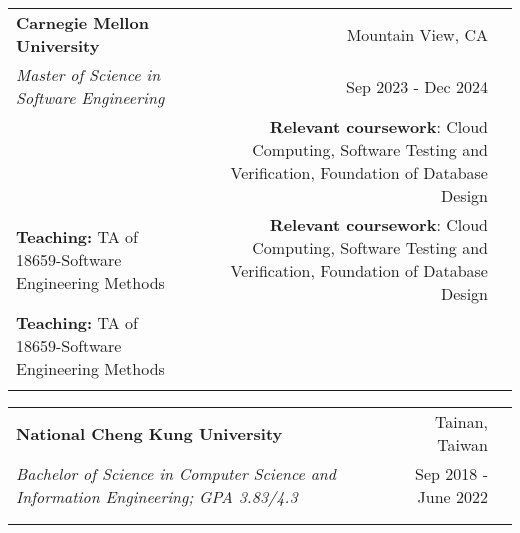 \newcommand{\resumeEduEntry}[5]{
  \vspace{5pt}\item
    \begin{tabular*}{0.97\textwidth}{l@{\extracolsep{\fill}}r}
      \textbf{#1} & \small #2 \\
      \textit{#3} & \small #4 \\
      \ifx&#5&%
      \else \small #5 \\ \fi
    \end{tabular*}\vspace{-5pt}
}

\resumeEduEntry 
{Carnegie Mellon University}
{Mountain View, CA}
{Master of Science in Software Engineering}
{Sep 2023 - Dec 2024}
{\textbf{Relevant coursework}: Cloud Computing, Software Testing and Verification, Foundation of Database Design \\
\textbf{Teaching: }TA of 18659-Software Engineering Methods}

\resumeEduEntry
{National Cheng Kung University}
{Tainan, Taiwan}
{Bachelor of Science in Computer Science and Information Engineering; GPA 3.83/4.3}
{Sep 2018 - June 2022}
{}

